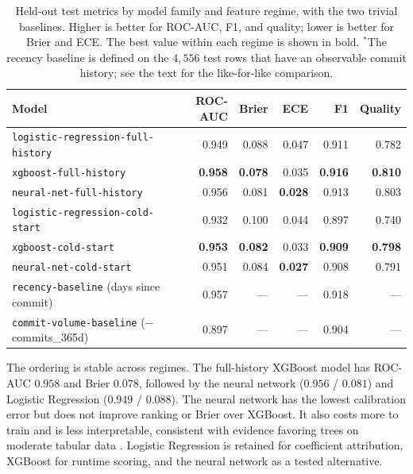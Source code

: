 \begin{table}[ht]
  \centering
  \caption{Held-out test metrics by model family and feature regime, with the two
  trivial baselines. Higher is better for ROC-AUC, F1, and quality; lower is
  better for Brier and ECE. The best value within each regime is shown in bold.
  \(^{*}\)The recency baseline is defined on the \(4{,}556\) test rows that have an
  observable commit history; see the text for the like-for-like comparison.}
  \label{tab:model-comparison}
  \small
  \setlength{\tabcolsep}{3.5pt}
  \begin{tabular}{lrrrrr}
    \toprule
    Model & ROC-AUC & Brier & ECE & F1 & Quality \\
    \midrule
    \texttt{logistic-regression-full-history} & 0.949 & 0.088 & 0.047 & 0.911 & 0.782 \\
    \texttt{xgboost-full-history}             & \textbf{0.958} & \textbf{0.078} & 0.035 & \textbf{0.916} & \textbf{0.810} \\
    \texttt{neural-net-full-history}          & 0.956 & 0.081 & \textbf{0.028} & 0.913 & 0.803 \\
    \midrule
    \texttt{logistic-regression-cold-start}   & 0.932 & 0.100 & 0.044 & 0.897 & 0.740 \\
    \texttt{xgboost-cold-start}               & \textbf{0.953} & \textbf{0.082} & 0.033 & \textbf{0.909} & \textbf{0.798} \\
    \texttt{neural-net-cold-start}            & 0.951 & 0.084 & \textbf{0.027} & 0.908 & 0.791 \\
    \midrule
    \texttt{recency-baseline} (days since commit)   & 0.957\rlap{$^{*}$} & --- & --- & 0.918 & --- \\
    \texttt{commit-volume-baseline} (\(-\)commits\_365d) & 0.897 & --- & --- & 0.904 & --- \\
    \bottomrule
  \end{tabular}
\end{table}

The ordering is stable across regimes. The full-history XGBoost model has
ROC-AUC \(0.958\) and Brier \(0.078\), followed by the neural network
(\(0.956\) / \(0.081\)) and Logistic Regression
(\(0.949\) / \(0.088\)). The neural network has the lowest calibration error but
does not improve ranking or Brier over XGBoost. It also costs more to train and
is less interpretable, consistent with evidence favoring trees on moderate
tabular data \cite{grinsztajn2022trees}. Logistic Regression is retained for
coefficient attribution, XGBoost for runtime scoring, and the neural network as
a tested alternative.

